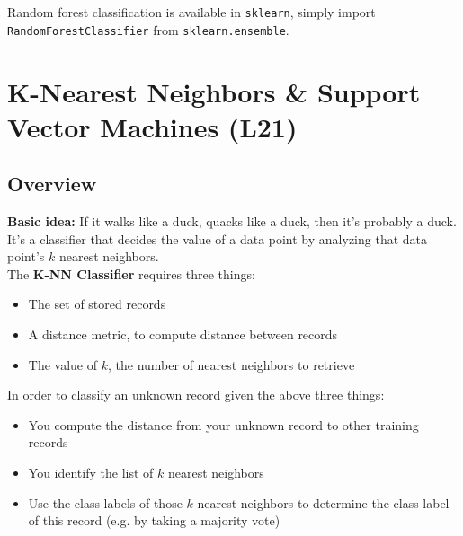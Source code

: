 \documentclass[english, 10pt]{article}
\begin{document}
Random forest classification is available in \texttt{sklearn}, simply import \texttt{RandomForestClassifier} from \texttt{sklearn.ensemble}.

\section{K-Nearest Neighbors \& Support Vector Machines (L21)}

\subsection{Overview}

\textbf{Basic idea:} If it walks like a duck, quacks like a duck, then it's probably a duck.\\

It's a classifier that decides the value of a data point by analyzing that data point's $k$ nearest neighbors.\\

The \textbf{K-NN Classifier} requires three things:
\begin{itemize}
	\item The set of stored records
	\item A distance metric, to compute distance between records
	\item The value of $k$, the number of nearest neighbors to retrieve
\end{itemize}

In order to classify an unknown record given the above three things:

\begin{itemize}
	\item You compute the distance from your unknown record to other training records
	\item You identify the list of $k$ nearest neighbors
	\item Use the class labels of those $k$ nearest neighbors to determine the class label of this record (e.g. by taking a majority vote)
\end{itemize}
\end{document}

